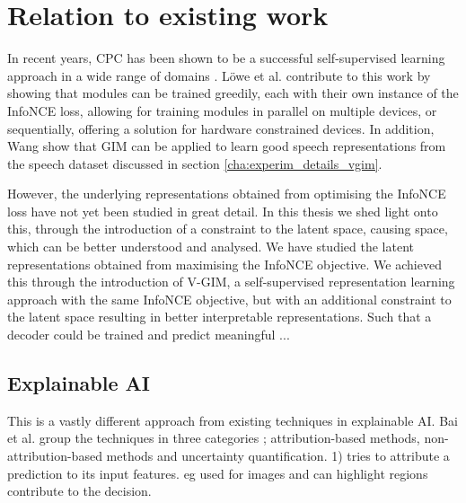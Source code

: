 
\chapter{Relation to existing work}

In recent years, CPC has been shown to be a successful self-supervised learning approach in a wide range of domains \cite{stackeEvaluationContrastivePredictive2020, dehaanContrastivePredictiveCoding2021, luSemiSupervisedHistologyClassification2019, bhatiSegmentalContrastivePredictive2021b, deldariTimeSeriesChange2021, henaffDataEfficientImageRecognition2020}. Löwe et al. contribute to this work by showing that modules can be trained greedily, each with their own instance of the InfoNCE loss, allowing for training modules in parallel on multiple devices, or sequentially, offering a solution for hardware constrained devices. In addition, Wang \cite{meihanwangSpeechRepresentationLearning2019} show that GIM can be applied to learn good speech representations from the speech dataset discussed in section \ref{cha:experim_details_vgim}.

However, the underlying representations obtained from optimising the InfoNCE loss have not yet been studied in great detail. In this thesis we shed light onto this, through the introduction of a constraint to the latent space, causing space, which can be better understood and analysed. 
	We have studied the latent representations obtained from maximising the InfoNCE objective. 
	We achieved this through the introduction of V-GIM, a self-supervised representation learning approach with the same InfoNCE objective, but with an additional constraint to the latent space resulting in better interpretable representations. Such that a decoder could be trained and predict meaningful ...
	
\section{Explainable AI}
	This is a vastly different approach from existing techniques in explainable AI. Bai et al. group the techniques in three categories \cite{baiExplainableDeepLearning2021}; attribution-based methods, non-attribution-based methods and uncertainty quantification.
	1) tries to attribute a prediction to its input features. eg used for images and can highlight regions contribute to the decision.
	
